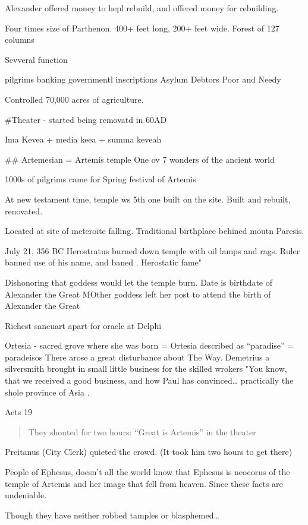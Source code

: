 \documentclass[
]{book}
\begin{document}
Alexander offered money to hepl rebuild, and offered money for rebuilding.

Four times size of Parthenon. 400+ feet long, 200+ feet wide. Forest of 127 columns

Sevveral function

pilgrims
banking
governmentl inscriptions
Asylum
Debtors
Poor and Needy

Controlled 70,000 acres of agriculture.

\#Theater - started being removatd in 60AD

Ima Kevea + media keea + summa keveah

\#\# Artemesian = Artemis temple One ov 7 wonders of the ancient world

1000s of pilgrims came for Spring festival of Artemis

At new testament time, temple ws 5th one built on the site. Built and rebuilt, renovated.

Located at site of meteroite falling. Traditional birthplace behined moutn Paresis.

July 21, 356 BC Herostratus burned down temple with oil lamps and rags. Ruler banned use of his name, and baned . Herostatic fame"

Dishonoring that goddess would let the temple burn. Date is birthdate of Alexander the Great MOther goddess left her post to attend the birth of Alexander the Great

Richest sancuart apart for oracle at Delphi

Ortesia - sacred grove where she was born = Ortesia described as ``paradise'' = paradeisos
There arose a great disturbance about The Way. Demetrius a silversmith brought in small little business for the skilled wrokers "You know, that we received a good business, and how Paul has convinced\ldots{} practically the shole province of Asia .

Acts 19

\begin{quote}
They shouted for two hours: ``Great is Artemis'' in the theater
\end{quote}

Preitanus (City Clerk) quieted the crowd. (It took him two hours to get there)

People of Ephesus, doesn't all the world know that Ephesus is neocorus of the temple of Artemis and her image that fell from heaven. Since these facts are undeniable.

Though they have neither robbed tamples or blasphemed\ldots{}
\end{document}
